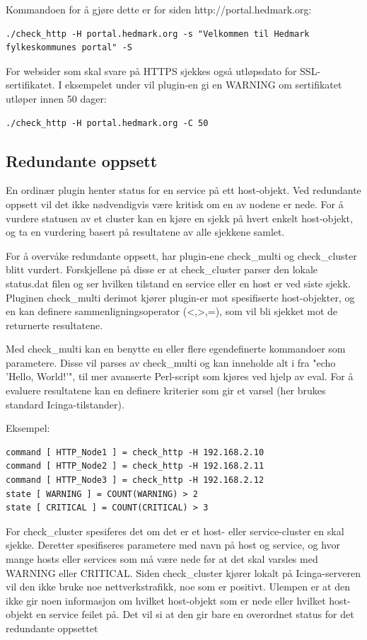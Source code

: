 Kommandoen for å gjøre dette er for siden http://portal.hedmark.org:
\begin{lstlisting}
./check_http -H portal.hedmark.org -s "Velkommen til Hedmark fylkeskommunes portal" -S 
\end{lstlisting}

For websider som skal svare på HTTPS sjekkes også utløpsdato for SSL-sertifikatet. I eksempelet under vil plugin-en gi en WARNING om sertifikatet utløper innen 50 dager:
\begin{lstlisting}
./check_http -H portal.hedmark.org -C 50
\end{lstlisting}

\subsection{Redundante oppsett}
En ordinær plugin henter status for en service på ett host-objekt. Ved redundante oppsett vil det ikke nødvendigvis være kritisk om en av nodene er nede. For å vurdere statusen av et cluster kan en kjøre en sjekk på hvert enkelt host-objekt, og ta en vurdering basert på resultatene av alle sjekkene samlet.

For å overvåke redundante oppsett, har plugin-ene check\_multi \cite{checkmulti} og check\_cluster \cite{checkcluster} blitt vurdert. Forskjellene på disse er at check\_cluster parser den lokale status.dat filen og ser hvilken tilstand en service eller en host er ved siste sjekk. Pluginen check\_multi derimot kjører plugin-er mot spesifiserte host-objekter, og en kan definere sammenligningsoperator (<,>,=), som vil bli sjekket mot de returnerte resultatene.

Med check\_multi kan en benytte en eller flere egendefinerte kommandoer som parametere. Disse vil parses av check\_multi og kan inneholde alt i fra "echo 'Hello, World!'", til mer avanserte Perl-script som kjøres ved hjelp av eval. For å evaluere resultatene kan en definere kriterier som gir et varsel (her brukes standard Icinga-tilstander). 

Eksempel:
\begin{lstlisting}
command [ HTTP_Node1 ] = check_http -H 192.168.2.10
command [ HTTP_Node2 ] = check_http -H 192.168.2.11
command [ HTTP_Node3 ] = check_http -H 192.168.2.12
state [ WARNING ] = COUNT(WARNING) > 2
state [ CRITICAL ] = COUNT(CRITICAL) > 3
\end{lstlisting}
For check\_cluster spesiferes det om det er et host- eller service-cluster en skal sjekke. Deretter spesifiseres parametere med navn på host og service, og hvor mange hosts eller services som må være nede før at det skal varsles med WARNING eller CRITICAL. Siden check\_cluster kjører lokalt på Icinga-serveren vil den ikke bruke noe nettverkstrafikk, noe som er positivt. Ulempen er at den ikke gir noen informasjon om hvilket host-objekt som er nede eller hvilket host-objekt en service feilet på. Det vil si at den gir bare en overordnet status for det redundante oppsettet     

